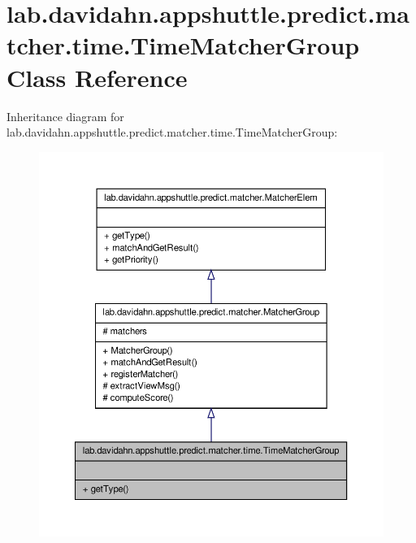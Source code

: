 \hypertarget{classlab_1_1davidahn_1_1appshuttle_1_1predict_1_1matcher_1_1time_1_1_time_matcher_group}{\section{lab.\-davidahn.\-appshuttle.\-predict.\-matcher.\-time.\-Time\-Matcher\-Group \-Class \-Reference}
\label{classlab_1_1davidahn_1_1appshuttle_1_1predict_1_1matcher_1_1time_1_1_time_matcher_group}
}


\-Inheritance diagram for lab.\-davidahn.\-appshuttle.\-predict.\-matcher.\-time.\-Time\-Matcher\-Group\-:
\nopagebreak
\begin{figure}[H]
\begin{center}
\leavevmode
\includegraphics[width=350pt]{classlab_1_1davidahn_1_1appshuttle_1_1predict_1_1matcher_1_1time_1_1_time_matcher_group__inherit__graph}
\end{center}
\end{figure}


